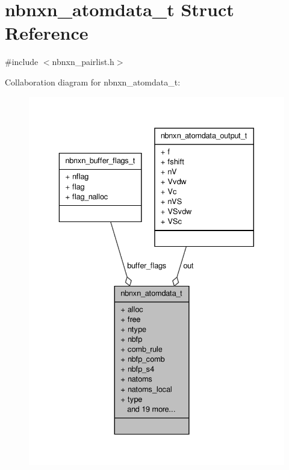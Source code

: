 \hypertarget{structnbnxn__atomdata__t}{\section{nbnxn\-\_\-atomdata\-\_\-t \-Struct \-Reference}
\label{structnbnxn__atomdata__t}
}


{\ttfamily \#include $<$nbnxn\-\_\-pairlist.\-h$>$}



\-Collaboration diagram for nbnxn\-\_\-atomdata\-\_\-t\-:
\nopagebreak
\begin{figure}[H]
\begin{center}
\leavevmode
\includegraphics[width=332pt]{structnbnxn__atomdata__t__coll__graph}
\end{center}
\end{figure}
